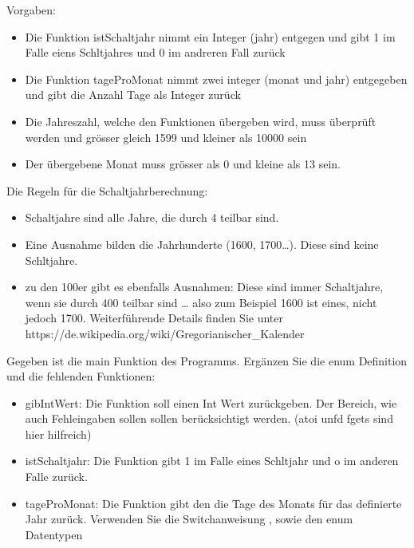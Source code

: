 \documentclass[a4paper,10pt,english]{report}
\begin{document}
\sphinxAtStartPar
Vorgaben:
\begin{itemize}
\item {} 
\sphinxAtStartPar
Die Funktion istSchaltjahr nimmt ein Integer (jahr) entgegen und gibt 1 im Falle eiens Schltjahres und 0 im andreren Fall zurück

\item {} 
\sphinxAtStartPar
Die Funktion tageProMonat nimmt zwei integer (monat und jahr) entgegeben und gibt die Anzahl Tage als Integer zurück

\item {} 
\sphinxAtStartPar
Die Jahreszahl, welche den Funktionen übergeben wird, muss überprüft werden und grösser gleich 1599 und kleiner als 10000 sein

\item {} 
\sphinxAtStartPar
Der übergebene Monat muss grösser als 0 und kleine als 13 sein.

\end{itemize}

\sphinxAtStartPar
Die Regeln für die Schaltjahrberechnung:
\begin{itemize}
\item {} 
\sphinxAtStartPar
Schaltjahre sind alle Jahre, die durch 4 teilbar sind.

\item {} 
\sphinxAtStartPar
Eine Ausnahme bilden die Jahrhunderte (1600, 1700…). Diese sind keine Schltjahre.

\item {} 
\sphinxAtStartPar
zu den 100er gibt es ebenfalls Ausnahmen: Diese sind immer Schaltjahre, wenn sie durch 400 teilbar sind
… also zum Beispiel 1600 ist eines, nicht jedoch 1700. Weiterführende Details finden Sie unter https://de.wikipedia.org/wiki/Gregorianischer\_Kalender

\end{itemize}

\sphinxAtStartPar
Gegeben ist die main Funktion des Programms. Ergänzen Sie die enum Definition und die fehlenden Funktionen:
\begin{itemize}
\item {} 
\sphinxAtStartPar
gibIntWert: Die Funktion soll einen Int Wert zurückgeben. Der Bereich, wie auch Fehleingaben sollen sollen berücksichtigt werden. (atoi unfd fgets sind hier hilfreich)

\item {} 
\sphinxAtStartPar
istSchaltjahr: Die Funktion gibt 1 im Falle eines Schltjahr und o im anderen Falle zurück.

\item {} 
\sphinxAtStartPar
tageProMonat: Die Funktion gibt den die Tage des Monats für das definierte Jahr zurück. Verwenden Sie die Switchanweisung , sowie den enum Datentypen

\end{itemize}
\end{document}
